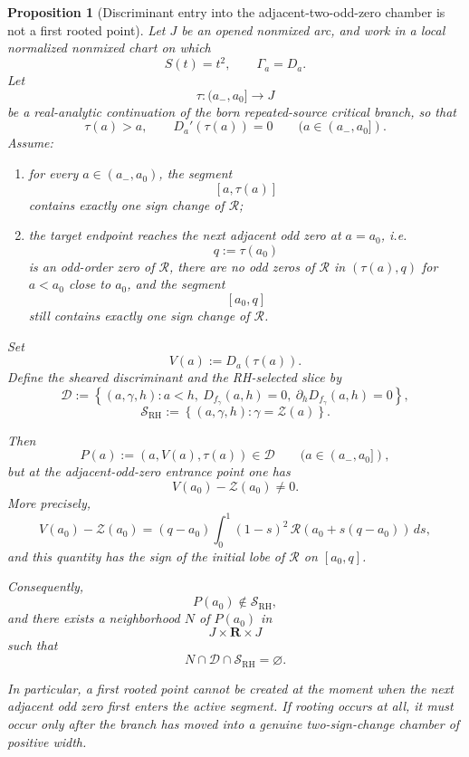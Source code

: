 \documentclass[11pt,a4paper]{amsart}
\theoremstyle{plain}
\newtheorem{proposition}[theorem]{Proposition}
\theoremstyle{definition}
\begin{document}
\begin{proposition}[Discriminant entry into the adjacent-two-odd-zero chamber is not a first rooted point]
\label{prop:discriminant-entry-not-first-root}
Let $J$ be an opened nonmixed arc, and work in a local normalized nonmixed
chart on which
\[
S(t)=t^2,
\qquad
\Gamma_a=D_a.
\]
Let
\[
\tau:(a_-,a_0]\to J
\]
be a real-analytic continuation of the born repeated-source critical branch,
so that
\[
\tau(a)>a,
\qquad
D_a'(\tau(a))=0
\qquad (a\in(a_-,a_0]).
\]
Assume:

\begin{enumerate}
\item for every $a\in(a_-,a_0)$, the segment
\[
[a,\tau(a)]
\]
contains exactly one sign change of $\mathcal R$;

\item the target endpoint reaches the next adjacent odd zero at $a=a_0$, i.e.
\[
q:=\tau(a_0)
\]
is an odd-order zero of $\mathcal R$, there are no odd zeros of $\mathcal R$
in $(\tau(a),q)$ for $a<a_0$ close to $a_0$, and the segment
\[
[a_0,q]
\]
still contains exactly one sign change of $\mathcal R$.
\end{enumerate}

Set
\[
V(a):=D_a(\tau(a)).
\]
Define the sheared discriminant and the RH-selected slice by
\[
\mathcal D:=
\left\{
(a,\gamma,h):a<h,\ D_{f_\gamma}(a,h)=0,\ \partial_h D_{f_\gamma}(a,h)=0
\right\},
\]
\[
\mathcal S_{\mathrm{RH}}
:=
\left\{
(a,\gamma,h):\gamma=\mathcal Z(a)
\right\}.
\]

Then
\[
P(a):=(a,V(a),\tau(a))\in\mathcal D
\qquad (a\in(a_-,a_0]),
\]
but at the adjacent-odd-zero entrance point one has
\[
V(a_0)-\mathcal Z(a_0)\neq 0.
\]
More precisely,
\[
V(a_0)-\mathcal Z(a_0)
=
(q-a_0)\int_0^1 (1-s)^2\,
\mathcal R(a_0+s(q-a_0))\,ds,
\]
and this quantity has the sign of the initial lobe of $\mathcal R$ on
$[a_0,q]$.

Consequently,
\[
P(a_0)\notin \mathcal S_{\mathrm{RH}},
\]
and there exists a neighborhood $N$ of $P(a_0)$ in
\[
J\times\mathbf R\times J
\]
such that
\[
N\cap\mathcal D\cap\mathcal S_{\mathrm{RH}}=\varnothing.
\]

In particular, a first rooted point cannot be created at the moment when the
next adjacent odd zero first enters the active segment. If rooting occurs at
all, it must occur only after the branch has moved into a genuine two-sign-change
chamber of positive width.
\end{proposition}
\end{document}
